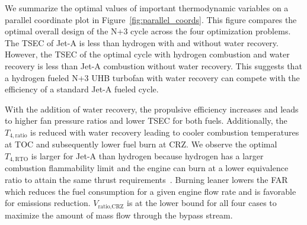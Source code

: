 \documentclass[conf]{new-aiaa}
\begin{document}
We summarize the optimal values of important thermodynamic variables on a parallel coordinate plot in Figure~\ref{fig:parallel_coords}.
This figure compares the optimal overall design of the N+3 cycle across the four optimization problems.
The TSEC of Jet-A is less than hydrogen with and without water recovery.
However, the TSEC of the optimal cycle with hydrogen combustion and water recovery is less than Jet-A combustion without water recovery.
This suggests that a hydrogen fueled N+3 UHB turbofan with water recovery can compete with the efficiency of a standard Jet-A fueled cycle.

With the addition of water recovery, the propulsive efficiency increases and leads to higher fan pressure ratios and lower TSEC for both fuels.
Additionally, the $T_{4,\text{ratio}}$ is reduced with water recovery leading to cooler combustion temperatures at TOC and subsequently lower fuel burn at CRZ.
We observe the optimal $T_{4,\text{RTO}}$ is larger for Jet-A than hydrogen because hydrogen has a larger combustion flammability limit and the engine can burn at a lower equivalence ratio to attain the same thrust requirements~\cite{Adler2023}.
Burning leaner lowers the FAR which reduces the fuel consumption for a given engine flow rate and is favorable for emissions reduction.
$V_\text{ratio,CRZ}$ is at the lower bound for all four cases to maximize the amount of mass flow through the bypass stream.
\end{document}
